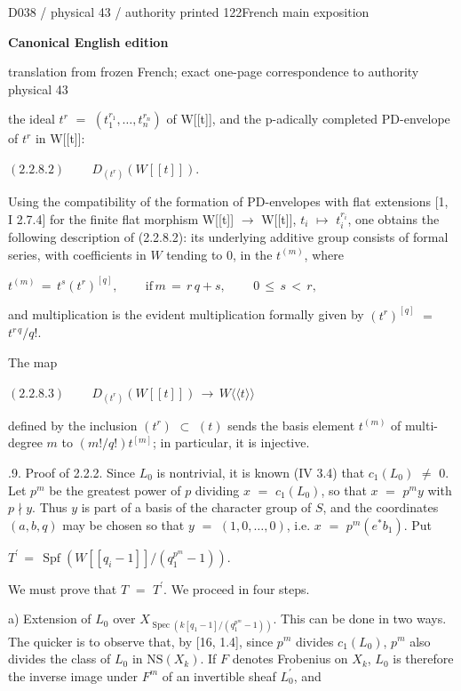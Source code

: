 \documentclass[9pt]{article}
\newcommand{\CanonText}[1]{\par{\fontsize{8.0}{9.35}\selectfont\RaggedRight #1\par}\vspace{2.2pt}}
\newcommand{\CanonDisplay}[1]{\par\vspace{1.2pt}\begin{center}{\fontsize{7.2}{8.4}\selectfont\(\displaystyle #1\)}\end{center}\vspace{1.2pt}}
\newcommand{\LayerTitle}{Canonical English edition}
\begin{document}
\noindent\begin{minipage}[t][\dimexpr\textheight-5pt\relax][t]{\textwidth}
{\sffamily\fontsize{7.3}{8.2}\selectfont\color{Quiet} D038 / physical 43 / authority printed 122\hfill French main exposition}
\par{}\vspace{4.5pt}
{\sffamily\fontsize{10.4}{11.6}\selectfont\bfseries\color{Accent} \LayerTitle}
\par{\sffamily\fontsize{6.7}{7.7}\selectfont\color{Quiet} translation from frozen French; exact one-page correspondence to authority physical 43}
\vspace{5pt}
\CanonText{the ideal \(t^{r}\) \(=\) \((t_{1}^{r_{1}},\ldots{},t_{n}^{r_{n}})\) of W[[t]], and the p-adically completed PD-envelope of \(t^{r}\) in W[[t]]:}
\CanonDisplay{(2.2.8.2)\qquad\,D_{(t^{r})}(W[[t]]).}
\CanonText{Using the compatibility of the formation of PD-envelopes with flat extensions [1, I 2.7.4] for the finite flat morphism W[[t]] \(\to{}\) W[[t]], \(t_{i}\) \(\mapsto{}\) \(t_{i}^{r_{i}}\), one obtains the following description of (2.2.8.2): its underlying additive group consists of formal series, with coefficients in \(W\) tending to 0, in the \(t^{(m)}\), where}
\CanonDisplay{t^{(m)}\,=\,t^{s}(t^{r})^{[q]},\qquad\,\text{if}\,m\,=\,r\,q+s,\qquad\,0\,\leq{}\,s\,<\,r,}
\CanonText{and multiplication is the evident multiplication formally given by \((t^{r})^{[q]}\) \(=\) \(t^{r\,q}/q\)!.}
\CanonText{The map}
\CanonDisplay{(2.2.8.3)\qquad\,D_{(t^{r})}(W[[t]])\,\to{}\,W\langle{}\langle{}t\rangle{}\rangle{}}
\CanonText{defined by the inclusion \((t^{r})\) \(\subset{}\) \((t)\) sends the basis element \(t^{(m)}\) of multi-degree \(m\) to \((m!/q!)t^{[m]}\); in particular, it is injective.}
\CanonText{2.2.9. Proof of 2.2.2. Since \(L_{0}\) is nontrivial, it is known (IV 3.4) that \(c_{1}(L_{0})\) \(\neq{}\) 0. Let \(p^{m}\) be the greatest power of \(p\) dividing \(x\) \(=\) \(c_{1}(L_{0})\), so that \(x\) \(=\) \(p^{m}y\) with \(p\nmid{}y\). Thus \(y\) is part of a basis of the character group of \(S\), and the coordinates \((a,b,q)\) may be chosen so that \(y\) \(=\) \((1,0,\ldots{},0)\), i.e. \(x\) \(=\) \(p^{m}(e^{*}b_{1})\). Put}
\CanonDisplay{T^{\prime}\,=\,\operatorname{Spf}(W[[q_{i}-1]]/(q_{1}^{p^{m}}-1)).}
\CanonText{We must prove that \(T\) \(=\) \(T^{\prime}\). We proceed in four steps.}
\CanonText{a) Extension of \(L_{0}\) over \(X_{\operatorname{Spec}(k[q_{1}-1]/(q_{1}^{p^{m}}-1))}\). This can be done in two ways. The quicker is to observe that, by [16, 1.4], since \(p^{m}\) divides \(c_{1}(L_{0})\), \(p^{m}\) also divides the class of \(L_{0}\) in \(\mathrm{NS}(X_{k})\). If \(F\) denotes Frobenius on \(X_{k}\), \(L_{0}\) is therefore the inverse image under \(F^{m}\) of an invertible sheaf \(L^{\prime}_{0}\), and}

\end{minipage}
\end{document}
